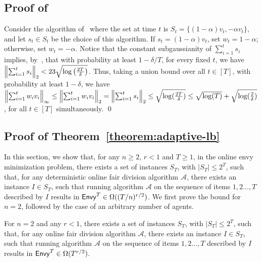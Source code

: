 \subsection{Proof of~}
    Consider the algorithm of~ where the set at time $t$ is $S_t = \{(1-\alpha)v_t, -\alpha v_t\}$, and let $s_t \in S_t$ be the choice of this algorithm. If $s_t = (1-\alpha) v_t$, set $w_t = 1-\alpha$; otherwise, set $w_t = -\alpha$. Notice that the constant subgaussianity of $\sum_{i=1}^t s_i$ implies, by~, that with probability at least $1- \delta / T$, for every fixed $t$, we have $\left\lVert\sum_{i=1}^t s_i\right\rVert_2 < 23 \sqrt{\log\left(\frac{2T}{\delta}\right)}$. Thus, taking a union bound over all $t\in [T]$, with probability at least $1-\delta$, we have $\left\lVert\sum_{i=1}^t w_i v_i\right\rVert_\infty \leq \left\lVert\sum_{i=1}^t w_i v_i\right\rVert_2 = \left\lVert\sum_{i=1}^t s_i\right\rVert_2 \leq \sqrt{\log(\frac{2T}{\delta})} \leq \sqrt{\log(T)} + \sqrt{\log(\frac{2}{\delta})}$, for all $t \in [T]$ simultaneously. \qed

\subsection{Proof of Theorem~\ref{theorem:adaptive-lb}}\label{app:proof from OR paper}

In this section, we show that, for any $n \geq 2$, $r < 1$ and $T \geq 1$, in the online envy minimization problem, there exists a set of instances $S_T$, with $|S_T|  \leq 2^T$, such that, for any deterministic online fair division algorithm $\mathcal{A}$, there exists an instance $I \in S_T$, such that running algorithm $\mathcal{A}$ on the sequence of items $1,2 \ldots, T$ described by $I$ results in $\mathsf{Envy}^T \in \Omega((T/n)^{r/2})$. We first prove the bound for $n=2$, followed by the case of an arbitrary number of agents.


\begin{lemma}\label{lem:LBn=2}
For $n = 2$ and any $r < 1$, there exists a set of instances $S_T$, with $|S_T|  \leq 2^T$, such that, for any online fair division algorithm $\mathcal{A}$, there exists an instance $I \in S_T$, such that running algorithm $\mathcal{A}$ on the sequence of items $1,2 \ldots, T$ described by $I$ results in $\mathsf{Envy}^T \in \Omega(T^{r/2})$.
\end{lemma}

